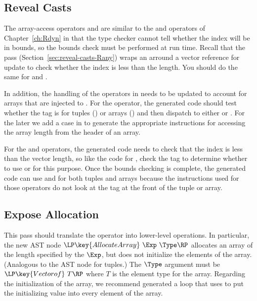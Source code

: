 \documentclass[7x10]{TimesAPriori_MIT}%
\begin{document}
{\subsection{Reveal Casts}

The array-access operators  and
 are similar to the  and
 operators of Chapter~\ref{ch:Rdyn} in
that the type checker cannot tell whether the index will be in bounds,
so the bounds check must be performed at run time.  Recall that the
 pass (Section~\ref{sec:reveal-casts-Rany}) wraps
an  arround a vector reference for update to check whether
the index is less than the length.  You should do the same for
 and  .

In addition, the handling of the  operators in
 needs to be updated to account for arrays that are
injected to . For the  operator, the
generated code should test whether the tag is for tuples ()
or arrays () and then dispatch to either
 or .  For the later
we add a case in  to generate the
appropriate instructions for accessing the array length from the
header of an array.

For the  and  operators,
the generated code needs to check that the index is less than the
vector length, so like the code for , check
the tag to determine whether to use  or
 for this purpose.  Once the bounds checking
is complete, the generated code can use  and
 for both tuples and arrays because the
instructions used for those operators do not look at the tag at the
front of the tuple or array.

\subsection{Expose Allocation}

This pass should translate the  operator into
lower-level operations. In particular, the new AST node
$\LP\key{AllocateArray}~\Exp~\Type\RP$ allocates an array of the
length specified by the $\Exp$, but does not initialize the elements
of the array. (Analogous to the  AST node for tuples.)
The $\Type$ argument must be $\LP\key{Vectorof}~T\RP$ where $T$ is the
element type for the array. Regarding the initialization of the array,
we recommend generated a  loop that uses
 to put the initializing value into every element of
the array.

}
\end{document}
